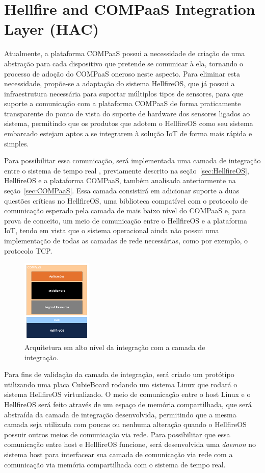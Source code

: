 \section{Hellfire and COMPaaS Integration Layer (HAC)}
\label{sec:HAC}
Atualmente, a plataforma COMPaaS possui a necessidade de criação de uma abstração para
cada dispositivo que pretende se comunicar à ela, tornando o processo de adoção do COMPaaS
oneroso neste aspecto. Para eliminar esta necessidade, propõe-se a adaptação do sistema
HellfireOS, que já possui a infraestrutura necessária para suportar múltiplos tipos de
sensores, para que suporte a comunicação com a plataforma COMPaaS de forma praticamente
transparente do ponto de vista do suporte de hardware dos sensores ligados ao sistema,
permitindo que os produtos que adotem o HellfireOS como seu sistema embarcado estejam aptos
a se integrarem à solução IoT de forma mais rápida e simples.

Para possibilitar essa comunicação, será implementada uma camada de integração entre o sistema de tempo real
, previamente descrito na seção~\ref{sec:HellfireOS}, HellfireOS e a plataforma COMPaaS, também analisada
anteriormente na seção~\ref{sec:COMPaaS}. Essa camada consistirá em adicionar suporte a duas questões
críticas no HellfireOS, uma biblioteca compatível com o protocolo de comunicação esperado pela camada de
mais baixo nível do COMPaaS e, para prova de conceito, um meio de comunicação entre o HellfireOS e a
plataforma IoT, tendo em vista que o sistema operacional ainda não possui uma implementação de todas as
camadas de rede necessárias, como por exemplo, o protocolo TCP.

\begin{figure}[H]
	\centering
		\includegraphics[width=0.3\textwidth]{fig/COMPaaS_HF.png}
	\caption{Arquitetura em alto nível da integração com a camada de integração.}
\end{figure}

Para fins de validação da camada de integração, será criado um protótipo utilizando uma placa
CubieBoard rodando um sistema Linux que rodará o sistema HellfireOS virtualizado. O meio de comunicação
entre o host Linux e o HellfireOS será feito através de um espaço de memória compartilhada, que será
abstraída da camada de integração desenvolvida, permitindo que a mesma camada seja utilizada com
poucas ou nenhuma alteração quando o HellfireOS possuir outros meios de comunicação via rede.
Para possibilitar que essa comunicação entre host e HellfireOS funcione, será desenvolvida uma
\textit{daemon} no sistema host para interfacear sua camada de comunicação via rede com a comunicação
via memória compartilhada com o sistema de tempo real.

